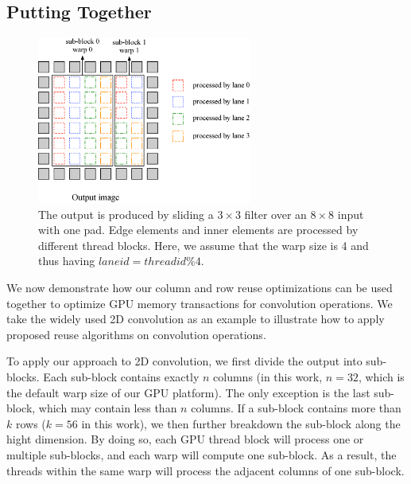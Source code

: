 \subsection{Putting Together}
\label{sec:together}
\begin{figure}
	\centering
	\includegraphics[width=0.9\columnwidth,height=5.5cm]{./figure/overalldesign.eps} \caption{The output is produced by sliding a $3 \times
3$ filter over an $8 \times 8$ input with one pad. Edge elements and inner elements are processed by different thread blocks. Here, we assume
that the warp size is 4 and thus having $laneid=threadid\%4$.} \label{fig:overalldesign}
\end{figure}


We now demonstrate how our column and row reuse optimizations can be used together to optimize GPU memory transactions for convolution
operations. We take the widely used 2D convolution as an example to illustrate how to apply proposed reuse algorithms on convolution
operations.


To apply our approach to 2D convolution, we first divide the output into sub-blocks. Each sub-block contains exactly $n$ columns (in this
work, $n = 32$, which is the default warp size of our GPU platform). The only exception is the last sub-block, which may contain less than
$n$ columns. If a sub-block contains more than $k$ rows ($k=56$ in this work), we then further breakdown the sub-block along the hight
dimension. By doing so, each GPU thread block will process one or multiple sub-blocks, and each warp will compute one sub-block. As a
result, the threads within the same warp will process the adjacent columns of one sub-block.


